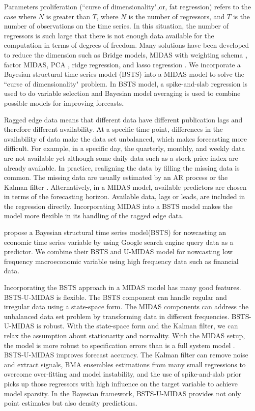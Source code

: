 Parameters proliferation (``curse of dimensionality",or, fat regression) refers to the case where $N$ is greater than $T$, where $N$ is the number of regressors,  and $T$ is the number of observations on the time series. In this situation, the number of regressors is such large that there is not enough data available for the computation in terms of degrees of freedom. Many solutions have been developed to reduce the dimension such as Bridge models, MIDAS with weighting schema \cite{Ghysels2012a}, factor MIDAS\cite{Stock2006}, PCA \cite{Boivin2006a}, ridge regression, and lasso regression\cite{DeMol2008} . We incorporate a Bayesian structural time series model (BSTS) into a MIDAS model to solve the ``curse of dimensionality" problem. In BSTS model, a spike-and-slab regression is used to do variable selection and Bayesian model averaging is used to combine possible models for improving forecasts.   


Ragged edge data means that different data have different publication lags and therefore different availability. At a specific time point, differences in the availability of data make the data set unbalanced, which makes forecasting more difficult. For example, in a specific day, the quarterly, monthly, and weekly data are not available yet although some daily data such as a stock price index are already available. In  practice, realigning the data by filling the missing data is common. The missing data are usually estimated by an AR process or the Kalman filter \cite{Foroni2013}. Alternatively, in a MIDAS model, available predictors are chosen in terms of the forecasting horizon. Available data, lags or leads, are included in the regression directly. Incorporating MIDAS into a BSTS model makes the model more flexible in its handling of the ragged edge data. 


  propose a Bayesian structural time series model(BSTS) for nowcasting an economic time series variable by using Google search engine query data as a predictor. We combine their BSTS and U-MIDAS model for nowcasting low frequency macroeconomic variable using high frequency data such as financial data. 
 
Incorporating the BSTS approach in a MIDAS model has many good features.  BSTS-U-MIDAS is flexible. The BSTS component can handle regular and irregular data using a state-space form. The MIDAS components can address the unbalanced data set problem by transforming data in different frequencies. BSTS-U-MIDAS is robust. With the state-space form and the Kalman filter, we can relax the assumption about stationarity and normality. With the MIDAS setup, the model is more robust to specification errors than is a full system model  \cite{Bai2013} . BSTS-U-MIDAS improves forecast accuracy. The Kalman filter can remove noise and extract signals, BMA ensembles estimations from many small regressions to overcome over-fitting and model instability, and the use of spike-and-slab prior picks up those regressors with high influence on the target variable to achieve model sparsity. In the Bayesian framework, BSTS-U-MIDAS  provides not only point estimates but also density predictions.


